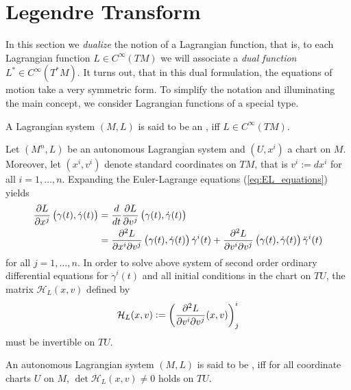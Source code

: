 \section*{Legendre Transform}
In this section we \emph{dualize} the notion of a Lagrangian function, that is, to each Lagrangian function $L \in C^\infty(TM)$ we will associate a \emph{dual function} $L^* \in C^\infty(T^*M)$. It turns out, that in this dual formulation, the equations of motion take a very symmetric form. To simplify the notation and illuminating the main concept, we consider Lagrangian functions of a special type.

\begin{definition}
	A Lagrangian system $(M,L)$ is said to be an , iff $L \in C^\infty(TM)$.
\end{definition}

Let $(M^n,L)$ be an autonomous Lagrangian system and $(U,x^i)$ a chart on $M$. Moreover, let $(x^i,v^i)$ denote standard coordinates on $TM$, that is $v^i := dx^i$ for all $i = 1,\dots,n$. Expanding the Euler-Lagrange equations (\ref{eq:EL_equations}) yields
\begin{align*}
	\frac{\partial L}{\partial x^j}\del[1]{\gamma(t),\dot{\gamma}(t)} &= \frac{d}{dt}\frac{\partial L}{\partial v^j}\del[1]{\gamma(t),\dot{\gamma}(t)}\\
	&= \frac{\partial^2 L}{\partial x^i\partial v^j}\del[1]{\gamma(t),\dot{\gamma}(t)}\dot{\gamma}^i(t) + \frac{\partial^2 L}{\partial v^i\partial v^j}\del[1]{\gamma(t),\dot{\gamma}(t)}\ddot{\gamma}^i(t)
\end{align*}
\noindent for all $j = 1,\dots,n$. In order to solve above system of second order ordinary differential equations for $\ddot{\gamma}^i(t)$ and all initial conditions in the chart on $TU$, the matrix $\mathcal{H}_L(x,v)$ defined by
\begin{equation}
	\label{eq:H_L}
	\mathcal{H}_L(x,v) := \del[3]{\frac{\partial^2 L}{\partial v^i\partial v^j}(x,v)}_j^i
\end{equation}
\noindent must be invertible on $TU$.

\begin{definition}
	An autonomous Lagrangian system $(M,L)$ is said to be , iff for all coordinate charts $U$ on $M$, $\det \mathcal{H}_L(x,v) \neq 0$ holds on $TU$. 
\end{definition}

